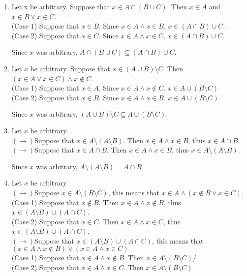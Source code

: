 \newcommand{\case}[1]{\\\hspace*{2em}(Case #1)}
\newcommand{\rdir}{\\$(\rightarrow)$}
\newcommand{\ldir}{\\$(\rightarrow)$}

\begin{enumerate}
    \item
    Let x be arbitrary. Suppose that $x \in A \cap (B \cup C)$. Then $x \in A$ and $x \in B \lor x \in C$.
    \case{1} Suppose that $x \in B$. Since $x \in A \land x \in B$, $x \in (A \cap B) \cup C$.
    \case{2} Suppose that $x \in C$. Since $x \in A \land x \in C$, $x \in (A \cap B) \cup C$.
    
    Since $x$ was arbitrary, $A \cap (B \cup C) \subseteq (A \cap B) \cup C$.
    \item
    Let $x$ be arbitrary. Suppose that $x \in (A \cup B) \setminus C$. Then $(x \in A \lor x \in C) \land x \notin C$.
    \case{1} Suppose that $x \in A$. Since $x \in A \land x\notin C$. $x \in A \cup (B \setminus C)$
    \case{2} Suppose that $x \in B$. Since $x \in A \land x \in B$. $x \in A \cup (B \setminus C)$
    
    Since $x$ was arbitrary, $(A \cup B) \setminus C \subseteq A \cup (B \setminus C)$.
    \item
    Let $x$ be arbitrary.
    \rdir Suppose that $x \in A \setminus (A \setminus B)$. Then $x \in A \land x \in B$, thus $x \in A \cap B$.
    \ldir Suppose that $x \in A \cap B$. Then $x \in A \land x \in B$, thus $x \in A \setminus (A \setminus B)$.

    Since $x$ was arbitrary, $A \setminus (A \setminus B) = A \cap B$
    \item
    Let $x$ be arbitrary.
    \rdir Suppose $x \in A \setminus (B \setminus C)$, this means that $x \in A \land (x \notin B \lor x \in C)$.
    \case{1} Suppose that $x \notin B$. Then $x \in A \land x \notin B$, thus $x \in (A \setminus B) \cup (A \cap C)$.
    \case{2} Suppose that $x \in C$. Then $x \in A \land x \in C$, thus $x \in (A \setminus B) \cup (A \cap C)$.
    \ldir Suppose that $x \in (A \setminus B) \cup (A \cap C)$, this means that $(x \in A \land x \notin B) \lor (x \in A \land x \in C)$
    \case{1} Suppose that $x \in A \land x \notin B$. Then $x \in A \setminus (B \setminus C)$/
    \case{2} Suppose that $x \in A \land x \in C$. Then $x \in A \setminus (B \setminus C)$


\end{enumerate}

